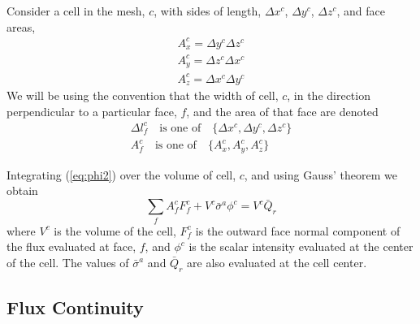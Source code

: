 \documentclass{article}
\begin{document}
Consider a cell in the mesh, $c$, with sides of length, $\Delta x^{c}$,
$\Delta y^{c}$, $\Delta z^{c}$, and face areas,
\begin{gather}
	A^{c}_{x} = \Delta y^{c} \Delta z^{c} \\
	A^{c}_{y} = \Delta z^{c} \Delta x^{c} \\
	A^{c}_{z} = \Delta x^{c} \Delta y^{c}
\end{gather}
We will be using the convention that the width of cell, $c$, in the direction
perpendicular to a particular face, $f$, and the area of that face are
denoted
\begin{gather}
	\Delta l^{c}_{f} \quad \text{is one of} \quad \{ \Delta x^{c}, 
				\Delta y^{c}, \Delta z^{c} \} \\
	A^{c}_{f} \quad \text{is one of} \quad \{ A^{c}_{x},
				 A^{c}_{y}, A^{c}_{z} \}
\end{gather}

Integrating (\ref{eq:phi2}) over the volume of cell, $c$,
and using Gauss' theorem we obtain
\begin{equation}
	\sum_{f} A^{c}_{f} F^{c}_{f} + V^{c} \bar{\sigma}^{a} \phi^{c}
		= V^{c} \bar{Q}_{r}
\label{eq:Balance}
\end{equation}
where $V^{c}$ is the volume of the cell, $F^{c}_{f}$ is the outward face normal
component of the flux evaluated at face, $f$, and $\phi^{c}$ is the
scalar intensity evaluated at the center of the cell.
The values of
$\bar{\sigma}^{a}$ and $\bar{Q}_{r}$ are also evaluated at the cell center.

\subsection{Flux Continuity}
\end{document}
